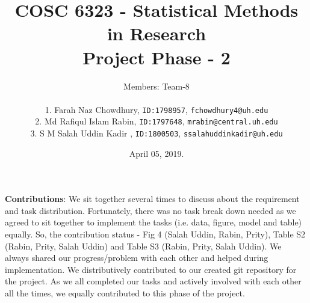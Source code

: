 \documentclass{article}\usepackage[]{graphicx}\usepackage[]{color}
\title{COSC 6323 - Statistical Methods in Research\\Project Phase - 2\\}
\author{%
    Members: Team-8 \\\\
    1. Farah Naz Chowdhury,    \texttt{ID:1798957}, \texttt{fchowdhury4@uh.edu}      \vspace{2pt} \\
    2. Md Rafiqul Islam Rabin, \texttt{ID:1797648}, \texttt{mrabin@central.uh.edu}   \vspace{2pt} \\
    3. S M Salah Uddin Kadir , \texttt{ID:1800503}, \texttt{ssalahuddinkadir@uh.edu} \vspace{2pt} \\
}
\date{April 05, 2019.}
\begin{document}
\maketitle
\par{\textbf{Contributions}: We sit together several times to discuss about the requirement and task distribution. Fortunately, there was no task break down needed as we agreed to sit together to implement the tasks (i.e. data, figure, model and table) equally. So, the contribution status - Fig 4 (Salah Uddin, Rabin, Prity), Table S2 (Rabin, Prity, Salah Uddin) and Table S3 (Rabin, Prity, Salah Uddin). We always shared our progress/problem with each other and helped during implementation. We distributively contributed to our created git repository for the project. As we all completed our tasks and actively involved with each other all the times, we equally contributed to this phase of the project.}

\newpage
\end{document}
